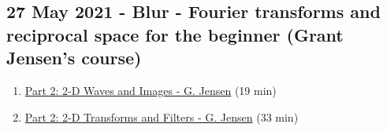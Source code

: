 \documentclass[11pt, oneside]{article}   	%
\begin{document}
\subsection{27 May 2021 - Blur - Fourier transforms and reciprocal space for the beginner (Grant Jensen's course)}
\begin{enumerate}
	\item \href{https://youtu.be/nyk75ufbP74}{Part 2: 2-D Waves and Images - G. Jensen} (19 min)
	\item \href{https://youtu.be/fEyLh9HqsWU}{Part 2: 2-D Transforms and Filters - G. Jensen} (33 min)
	\end{enumerate}
\end{document}
